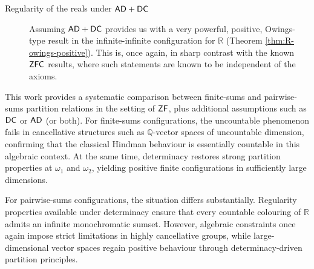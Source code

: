 \documentclass[10pt,a4paper]{amsart}
\theoremstyle{definition}
\newcommand{\zf}{\mathnormal{\mathsf{ZF}}}
\newcommand{\dc}{\mathnormal{\mathsf{DC}}}
\newcommand{\ad}{\mathnormal{\mathsf{AD}}}
\newcommand{\zfc}{\mathnormal{\mathsf{ZFC}}}
\theoremstyle{remark}
\numberwithin{equation}{section}
\begin{document}
\begin{description}
\item[Regularity of the reals under $\ad+\dc$]
Assuming $\ad+\dc$ provides us with a very powerful, positive, Owings-type result in the infinite-infinite configuration for $\mathbb R$ (Theorem \ref{thm:R-owings-positive}). This is, once again, in sharp contrast with the known $\zfc$ results, where such statements are known to be independent of the axioms.
\end{description}







This work provides a systematic comparison between finite-sums and pairwise-sums partition relations in the setting of $\zf$, plus additional assumptions such as $\dc$ or $\ad$ (or both). For finite-sums configurations, the uncountable phenomenon fails in cancellative structures such as $\mathbb{Q}$-vector spaces of uncountable dimension, confirming that the classical Hindman behaviour is essentially countable in this algebraic context. 
At the same time, determinacy restores strong partition properties at $\omega_1$ and $\omega_2$, yielding positive finite configurations in sufficiently large dimensions.

For pairwise-sums configurations, the situation differs substantially. 
Regularity properties available under determinacy ensure that every countable colouring of $\mathbb{R}$ admits an infinite monochromatic sumset. 
However, algebraic constraints once again impose strict limitations in highly cancellative groups, while large-dimensional vector spaces regain positive behaviour through determinacy-driven partition principles.
\end{document}
